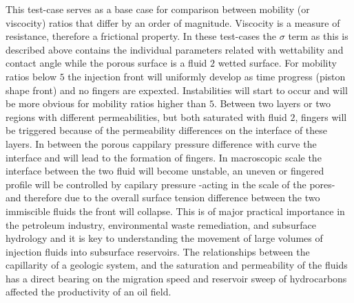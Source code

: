 \documentclass[preprint,authoryear,12pt]{elsarticle}
\begin{document}
This test-case serves as a base case for comparison between mobility (or viscocity) ratios that differ by an order of magnitude. Viscocity is a measure of resistance, therefore a frictional property. In these test-cases the $\sigma$ term as this is described above contains the individual parameters related with wettability and contact angle while the porous surface is a fluid $2$ wetted surface. For mobility ratios below $5$ the injection front will uniformly develop as time progress (piston shape front) and no fingers are expexted. Instabilities will start to occur and will be more obvious for mobility ratios higher than $5$. Between two layers or two regions with different permeabilities, but both saturated with fluid $2$, fingers will be triggered because of the permeability differences on the interface of these layers. In between the porous cappilary pressure difference with curve the interface and will lead to the formation of fingers. In macroscopic scale the interface between the two fluid will become unstable, an uneven or fingered profile will be controlled by capilary pressure -acting in the scale of the pores- and therefore due to the overall surface tension difference between the two immiscible fluids the front will collapse. This is of major practical importance in the petroleum industry, environmental waste remediation, and subsurface hydrology and it is key to understanding the movement of large volumes of injection fluids into subsurface reservoirs. The relationships between the capillarity of a geologic system, and the saturation and permeability of the fluids has a direct bearing on the migration speed and reservoir sweep of hydrocarbons affected the productivity of an oil field.
\end{document}
